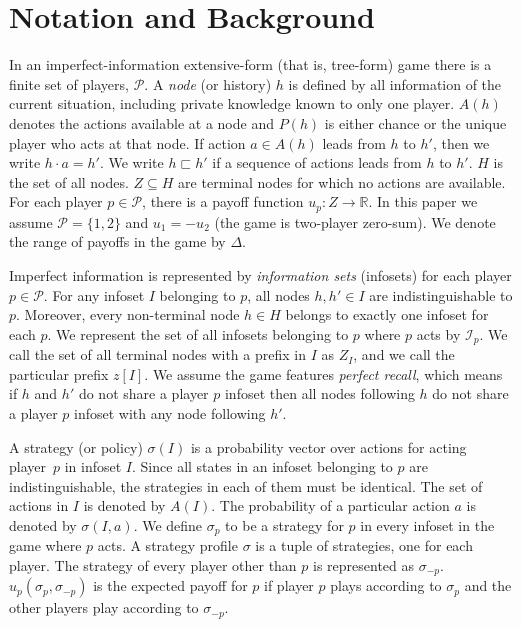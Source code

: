 \documentclass{article}
\newcommand{\adam}[1]{\textbf{\textcolor{magenta}{#1}}}
\begin{document}

\section{Notation and Background}
\vspace{-0.03in}
\label{sec:background}
In an imperfect-information extensive-form (that is, tree-form) game there is a finite set of players, $\mathcal{P}$. A \emph{node} (or history) $h$ is defined by all information of the current situation, including private knowledge known to only one player. $A(h)$ denotes the actions available at a node and $P(h)$ is either chance or the unique player who acts at that node. If action $a \in A(h)$ leads from $h$ to $h'$, then we write $h \cdot a = h'$. We write $h \sqsubset h'$ if a sequence of actions leads from $h$ to $h'$. $H$ is the set of all nodes.
$Z \subseteq H$ are terminal nodes for which no actions are available. For each player $p \in \mathcal{P}$, there is a payoff function $u_p: Z\rightarrow \mathbb{R}$. 
In this paper we assume $\mathcal{P} = \{1, 2\}$ and $u_1 = -u_2$ (the game is two-player zero-sum).
We denote the range of payoffs in the game by $\Delta$.

Imperfect information is represented by {\em information sets} (infosets) for each player $p \in \mathcal{P}$. For any infoset $I$ belonging to $p$, all nodes $h, h' \in I$ are indistinguishable to $p$. Moreover, every non-terminal node $h \in H$ belongs to exactly one infoset for each $p$. We represent the set of all infosets belonging to $p$ where $p$ acts by $\mathcal{I}_p$. We call the set of all terminal nodes with a prefix in $I$ as $Z_I$, and we call the particular prefix $z[I]$. We assume the game features \emph{perfect recall}, which means if $h$ and $h'$ do not share a player $p$ infoset then all nodes following $h$ do not share a player $p$ infoset with any node following $h'$.

A strategy (or policy) $\sigma(I)$ is a probability vector over actions for acting player~$p$ in infoset $I$. Since all states in an infoset belonging to $p$ are indistinguishable, the strategies in each of them must be identical. The set of actions in $I$ is denoted by $A(I)$. The probability of a particular action $a$ is denoted by $\sigma(I,a)$.
We define $\sigma_p$ to be a strategy for $p$ in every infoset in the game where $p$ acts.
A strategy profile $\sigma$ is a tuple of strategies, one for each player. The strategy of every player other than $p$ is represented as $\sigma_{-p}$. $u_p(\sigma_p, \sigma_{-p})$ is the expected payoff for $p$ if player $p$ plays according to $\sigma_p$ and the other players play according to $\sigma_{-p}$.
\end{document}
